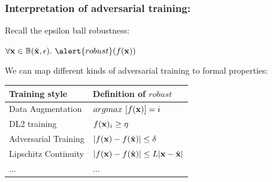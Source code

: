 \documentclass[t,compress,aspectratio=169]{beamer}
\begin{document}
\begin{frame}
  \frametitle{Interpretation of adversarial training:}
  \vspace{-2em}
      \begin{block}{Recall the epsilon ball robustness:}

       $\forall \x \in \mathbb{B}(\hat{\x}, \epsilon). \ \alert{robust}(f(\x)) $
\end{block}

     We can map different kinds of adversarial training to formal properties:
          	\begin{tabular}{p{3.5cm}|p{5.5cm}}
		Training style & Definition of \alert{$robust$}  \\ \hline \hline
		Data Augmentation & 	$ argmax\ [f(\mathbf{x})] = i$  \\ \hline
		DL2 training & 	$f(\mathbf{x})_i \geq \eta$  \\ \hline
		Adversarial Training & 	$ |f(\mathbf{x}) - f(\hat{\mathbf{x}})| \leq \delta$ \\ \hline
          Lipschitz Continuity & 	$ |f(\mathbf{x}) - f(\hat{\mathbf{x}})| \leq L|\mathbf{x}-\hat{\mathbf{x}}|$  \\ \hline
          ... & ... \\

	\end{tabular}


       {\scriptsize
 \begin{thebibliography}{99}
   \beamertemplatearticlebibitems
\end{thebibliography}}




  \end{frame}
\end{document}
